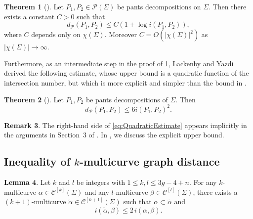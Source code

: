 \documentclass[a4paper,11pt]{amsart}
\numberwithin{equation}{section}
\theoremstyle{definition}
\newtheorem{theorem}{Theorem}[section]
\newtheorem{remark}[theorem]{Remark}
\newtheorem{lemma}[theorem]{Lemma}
\newcommand{\multicurve}[1]{\mathcal{C}^{[#1]}}
\begin{document}
\begin{theorem}[{\cite[Theorem 1.1]{lackenby2024bounds}}]\label{theorem:HempelLemmaForPantsGraph}
    Let $P_1,P_2\in \mathcal{P}(\Sigma)$ be pants decompositions on $\Sigma$.
    Then there exists a constant $C>0$ such that 
    \begin{equation*}
        d_{\mathcal{P}}(P_1,P_2)\leq C (1+\log i(P_1,P_2)), 
    \end{equation*}
    where $C$ depends only on $\chi(\Sigma)$.
    Moreover $C=O(|\chi(\Sigma)|^2) $ as $|\chi(\Sigma)|\to \infty$.
\end{theorem}

Furthermore, as an intermediate step in the proof of \cref{theorem:HempelLemmaForPantsGraph}, Lackenby and Yazdi derived the following estimate, whose upper bound is a quadratic function of the intersection number, but which is more explicit and simpler than the bound in .

\begin{theorem}[{\cite[Corollary 3.16]{lackenby2024bounds}}]\label{theorem:QuadraticBound}
Let $P_1, P_2$ be pants decompositions of $\Sigma$.
Then
\begin{equation}\label{eq:QuadraticEstimate}
d_{\mathcal{P}}(P_1,P_2) \leq 6 i(P_1,P_2)^2.
\end{equation}
\end{theorem}

\begin{remark}
The right-hand side of \cref{eq:QuadraticEstimate} appears implicitly in the arguments in Section~3 of \cite{lackenby2024bounds}.
In , we discuss the explicit upper bound.
\end{remark}

\subsection{Inequality of $k$-multicurve graph distance}

\begin{lemma}\label{lemma:Extension}
    Let $k$ and $l$ be integers with $1 \le k,l \le 3g-4+n$.
    For any $k$-multicurve $\alpha \in \multicurve{k}(\Sigma)$ and any $l$-multicurve $\beta \in \multicurve{l}(\Sigma)$, there exists a $(k+1)$-multicurve $\tilde{\alpha} \in \multicurve{k+1}(\Sigma)$ such that $\alpha \subset \tilde{\alpha}$ and
    \begin{equation*}
        i(\tilde{\alpha}, \beta) \le 2\, i(\alpha, \beta).
    \end{equation*}
\end{lemma}
\end{document}
